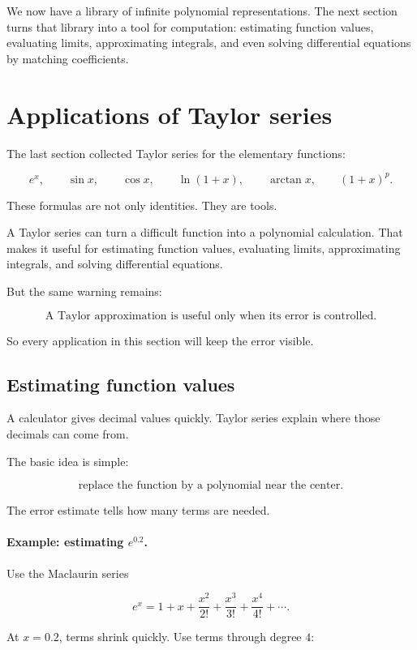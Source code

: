 We now have a library of infinite polynomial representations.  The next section turns
that library into a tool for computation: estimating function values, evaluating limits,
approximating integrals, and even solving differential equations by matching
coefficients.

\section{Applications of Taylor series}
\label{sec:applications-taylor-series}

The last section collected Taylor series for the elementary functions:

\[
e^x,\qquad \sin x,\qquad \cos x,\qquad \ln(1+x),\qquad \arctan x,
\qquad (1+x)^p.
\]

These formulas are not only identities.  They are tools.

A Taylor series can turn a difficult function into a polynomial calculation.  That makes
it useful for estimating function values, evaluating limits, approximating integrals, and
solving differential equations.

But the same warning remains:

\[
\boxed{
\text{A Taylor approximation is useful only when its error is controlled.}
}
\]

So every application in this section will keep the error visible.

\subsection{Estimating function values}
\label{subsec:estimating-function-values-taylor}

A calculator gives decimal values quickly.  Taylor series explain where those decimals can
come from.

The basic idea is simple:

\[
\text{replace the function by a polynomial near the center.}
\]

The error estimate tells how many terms are needed.

\paragraph{Example: estimating \(e^{0.2}\).}
Use the Maclaurin series

\[
e^x=
1+x+\frac{x^2}{2!}+\frac{x^3}{3!}+\frac{x^4}{4!}+\cdots.
\]

At \(x=0.2\), terms shrink quickly.  Use terms through degree \(4\):

